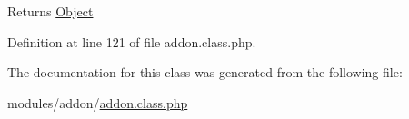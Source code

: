 \begin{DoxyReturn}{Returns}
\hyperlink{classObject}{Object} 
\end{DoxyReturn}


Definition at line 121 of file addon.\-class.\-php.



The documentation for this class was generated from the following file\-:\begin{DoxyCompactItemize}
\item 
modules/addon/\hyperlink{addon_8class_8php}{addon.\-class.\-php}\end{DoxyCompactItemize}
